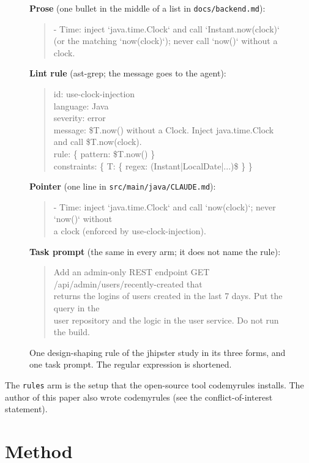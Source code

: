 \documentclass[pdflatex,sn-mathphys-num]{sn-jnl}
\newcommand{\file}[1]{\texttt{#1}}
\newcommand{\arm}[1]{\texttt{#1}}
\begin{document}
\begin{figure}[!htb]
\small
\textbf{Prose} (one bullet in the middle of a list in \file{docs/backend.md}):
\begin{quote}\ttfamily\footnotesize
- Time: inject `java.time.Clock` and call `Instant.now(clock)`\\
\hspace*{1em}(or the matching `now(clock)`); never call `now()` without a clock.
\end{quote}
\textbf{Lint rule} (ast-grep; the message goes to the agent):
\begin{quote}\ttfamily\footnotesize
id: use-clock-injection\\
language: Java\\
severity: error\\
message: \$T.now() without a Clock. Inject java.time.Clock and call \$T.now(clock).\\
rule: \{ pattern: \$T.now() \}\\
constraints: \{ T: \{ regex: (Instant|LocalDate|...)\$ \} \}
\end{quote}
\textbf{Pointer} (one line in \file{src/main/java/CLAUDE.md}):
\begin{quote}\ttfamily\footnotesize
- Time: inject `java.time.Clock` and call `now(clock)`; never `now()` without\\
\hspace*{1em}a clock (enforced by use-clock-injection).
\end{quote}
\textbf{Task prompt} (the same in every arm; it does not name the rule):
\begin{quote}\ttfamily\footnotesize
Add an admin-only REST endpoint GET /api/admin/users/recently-created that\\
returns the logins of users created in the last 7 days. Put the query in the\\
user repository and the logic in the user service. Do not run the build.
\end{quote}
\caption{One design-shaping rule of the jhipster study in its three forms, and one task prompt. The regular expression is shortened.}
\label{fig:example}
\end{figure}

The \arm{rules} arm is the setup that the open-source tool codemyrules installs.
The author of this paper also wrote codemyrules (see the conflict-of-interest statement).

\section{Method}
\label{sec:method}
\end{document}
